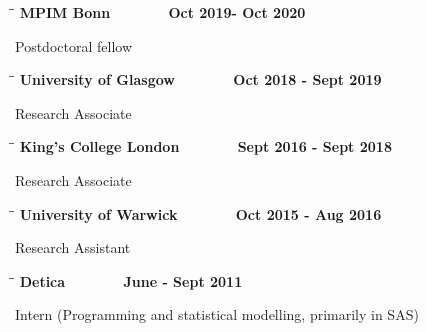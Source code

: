 \documentclass{res}
\begin{document}
\begin{resume}
\vspace{-0.1in}	
   \begin{tabbing}
   \hspace{2in}\= \hspace{2in}\= \kill %
    {\bf MPIM Bonn}\>~\> ~~~~~~ {\bf Oct 2019- Oct 2020}\\
   \end{tabbing}\vspace{-20pt}      %
      Postdoctoral fellow  

\vspace{-0.1in}	
   \begin{tabbing}
   \hspace{2in}\= \hspace{2in}\= \kill %
    {\bf University of Glasgow}\>~\> ~~~~~~ {\bf Oct 2018 - Sept 2019}\\
   \end{tabbing}\vspace{-20pt}      %
      Research Associate   

\vspace{-0.1in}	
   \begin{tabbing}
   \hspace{2in}\= \hspace{2in}\= \kill %
    {\bf King's College London}\>~\> ~~~~~~ {\bf Sept 2016 - Sept 2018}\\
   \end{tabbing}\vspace{-20pt}      %
      Research Associate   
   
\vspace{-0.1in}	
   \begin{tabbing}
   \hspace{2in}\= \hspace{2in}\= \kill %
    {\bf University of Warwick}\>~\> ~~~~~~ {\bf Oct 2015 - Aug 2016}\\
   \end{tabbing}\vspace{-20pt}      %
      Research Assistant    
      
\vspace{-0.1in}	
   \begin{tabbing}
   \hspace{2in}\= \hspace{2in}\= \kill %
    {\bf Detica}\>~\> ~~~~~~ {\bf June - Sept 2011}\\
   \end{tabbing}\vspace{-20pt}      %
      Intern (Programming and statistical modelling, primarily in SAS)    
      

\end{resume}
\end{document}
